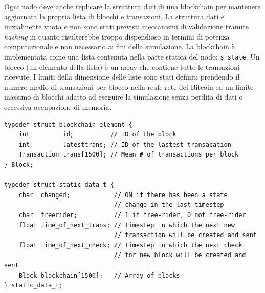 Ogni nodo deve anche replicare la struttura dati di una blockchain per mantenere aggiornata la propria lista di blocchi e transazioni. La struttura dati è inizialmente vuota e non sono stati previsti meccanismi di validazione tramite \textit{hashing} in quanto risulterebbe troppo dispendioso in termini di potenza computazionale e non necessario ai fini della simulazione. La blockchain è implementata come una lista contenuta nella parte statica del nodo: \texttt{s\_state}. Un blocco (un elemento della lista) è un array che contiene tutte le transazioni ricevute. I limiti della dimensione delle liste sono stati definiti prendendo il numero medio di transazioni per blocco nella reale rete dei Bitcoin ed un limite massimo di blocchi adatto ad eseguire la simulazione senza perdita di dati o eccessiva occupazione di memoria.
\begin{code}
\begin{verbatim}
typedef struct blockchain_element {
    int         id;          // ID of the block
    int         latesttrans; // ID of the lastest transacation
    Transaction trans[1500]; // Mean # of transactions per block
} Block;

typedef struct static_data_t {
    char  changed;            // ON if there has been a state
                              // change in the last timestep
    char  freerider;          // 1 if free-rider, 0 not free-rider
    float time_of_next_trans; // Timestep in which the next new
                              // transaction will be created and sent
    float time_of_next_check; // Timestep in which the next check
                              // for new block will be created and sent
    Block blockchain[1500];   // Array of blocks
} static_data_t;
\end{verbatim}


\end{code}
